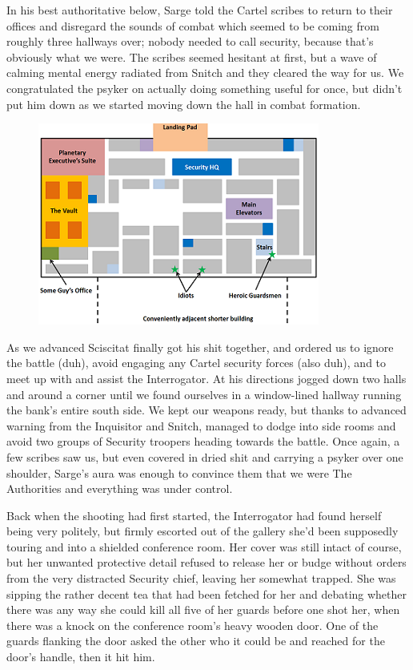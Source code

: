 In his best authoritative below, Sarge told the Cartel scribes to return to their offices and disregard the sounds of combat which seemed to be coming from roughly three hallways over; 
nobody needed to call security, because that's obviously what we were. 
The scribes seemed hesitant at first, but a wave of calming mental energy radiated from Snitch and they cleared the way for us. 
We congratulated the psyker on actually doing something useful for once, but didn't put him down as we started moving down the hall in combat formation.

\begin{figure}
	\begin{center}
		\includegraphics[width=\figwidth]{pics/18/25-large.png}
	\end{center}
\end{figure}
As we advanced Sciscitat finally got his shit together, and ordered us to ignore the battle (duh), avoid engaging any Cartel security forces (also duh), and to meet up with and assist the Interrogator. 
At his directions jogged down two halls and around a corner until we found ourselves in a window-lined hallway running the bank's entire south side. 
We kept our weapons ready, but thanks to advanced warning from the Inquisitor and Snitch, managed to dodge into side rooms and avoid two groups of Security troopers heading towards the battle. 
Once again, a few scribes saw us, but even covered in dried shit and carrying a psyker over one shoulder, Sarge's aura was enough to convince them that we were The Authorities and everything was under control.

Back when the shooting had first started, the Interrogator had found herself being very politely, but firmly escorted out of the gallery she'd been supposedly touring and into a shielded conference room. 
Her cover was still intact of course, but her unwanted protective detail refused to release her or budge without orders from the very distracted Security chief, leaving her somewhat trapped. 
She was sipping the rather decent tea that had been fetched for her and debating whether there was any way she could kill all five of her guards before one shot her, when there was a knock on the conference room's heavy wooden door. 
One of the guards flanking the door asked the other who it could be and reached for the door's handle, then it hit him.


